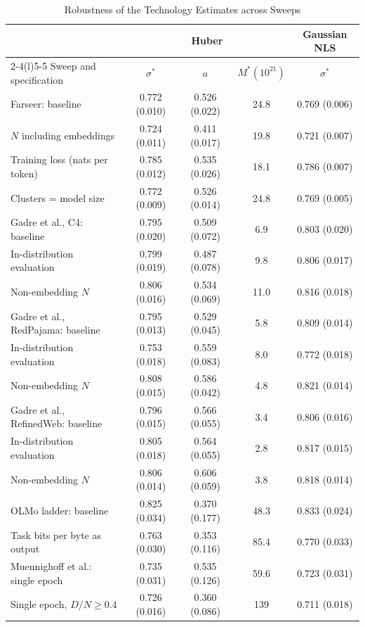 \begin{table}[tp]
\centering
\caption{Robustness of the Technology Estimates across Sweeps}
\label{tab:app-robust}
\footnotesize
\setlength{\tabcolsep}{4pt}
\begin{tabular}{@{}lcccc@{}}
\toprule
 & \multicolumn{3}{c}{Huber} & Gaussian NLS \\
\cmidrule(lr){2-4}\cmidrule(l){5-5}
Sweep and specification & $\sigma^*$ & $a$ & $M^*(10^{21})$ & $\sigma^*$ \\
\midrule
Farseer: baseline & 0.772 (0.010) & 0.526 (0.022) & 24.8 & 0.769 (0.006) \\
\quad $N$ including embeddings & 0.724 (0.011) & 0.411 (0.017) & 19.8 & 0.721 (0.007) \\
\quad Training loss (nats per token) & 0.785 (0.012) & 0.535 (0.026) & 18.1 & 0.786 (0.007) \\
\quad Clusters = model size & 0.772 (0.009) & 0.526 (0.014) & 24.8 & 0.769 (0.005) \\
\addlinespace
Gadre et al., C4: baseline & 0.795 (0.020) & 0.509 (0.072) & 6.9 & 0.803 (0.020) \\
\quad In-distribution evaluation & 0.799 (0.019) & 0.487 (0.078) & 9.8 & 0.806 (0.017) \\
\quad Non-embedding $N$ & 0.806 (0.016) & 0.534 (0.069) & 11.0 & 0.816 (0.018) \\
Gadre et al., RedPajama: baseline & 0.795 (0.013) & 0.529 (0.045) & 5.8 & 0.809 (0.014) \\
\quad In-distribution evaluation & 0.753 (0.018) & 0.559 (0.083) & 8.0 & 0.772 (0.018) \\
\quad Non-embedding $N$ & 0.808 (0.015) & 0.586 (0.042) & 4.8 & 0.821 (0.014) \\
Gadre et al., RefinedWeb: baseline & 0.796 (0.015) & 0.566 (0.055) & 3.4 & 0.806 (0.016) \\
\quad In-distribution evaluation & 0.805 (0.018) & 0.564 (0.055) & 2.8 & 0.817 (0.015) \\
\quad Non-embedding $N$ & 0.806 (0.014) & 0.606 (0.059) & 3.8 & 0.818 (0.014) \\
\addlinespace
OLMo ladder: baseline & 0.825 (0.034) & 0.370 (0.177) & 48.3 & 0.833 (0.024) \\
\quad Task bits per byte as output & 0.763 (0.030) & 0.353 (0.116) & 85.4 & 0.770 (0.033) \\
\addlinespace
Muennighoff et al.: single epoch & 0.735 (0.031) & 0.535 (0.126) & 59.6 & 0.723 (0.031) \\
\quad Single epoch, $D/N\geq0.4$ & 0.726 (0.016) & 0.360 (0.086) & 139 & 0.711 (0.018) \\

\end{tabular}
\end{table}
